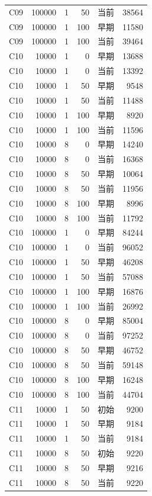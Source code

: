 \documentclass[UTF8,a4paper,10pt,twocolumn,fontset=fandol]{ctexart}
\begin{document}
\begin{longtable}{@{}lrrrlr@{}}
C09 & 100000 & 1 & 50 & 当前 & 38564 \\
C09 & 100000 & 1 & 100 & 早期 & 11580 \\
C09 & 100000 & 1 & 100 & 当前 & 39464 \\
C10 & 10000 & 1 & 0 & 早期 & 13688 \\
C10 & 10000 & 1 & 0 & 当前 & 13392 \\
C10 & 10000 & 1 & 50 & 早期 & 9548 \\
C10 & 10000 & 1 & 50 & 当前 & 11488 \\
C10 & 10000 & 1 & 100 & 早期 & 8920 \\
C10 & 10000 & 1 & 100 & 当前 & 11596 \\
C10 & 10000 & 8 & 0 & 早期 & 14240 \\
C10 & 10000 & 8 & 0 & 当前 & 16368 \\
C10 & 10000 & 8 & 50 & 早期 & 10064 \\
C10 & 10000 & 8 & 50 & 当前 & 11956 \\
C10 & 10000 & 8 & 100 & 早期 & 8996 \\
C10 & 10000 & 8 & 100 & 当前 & 11792 \\
C10 & 100000 & 1 & 0 & 早期 & 84244 \\
C10 & 100000 & 1 & 0 & 当前 & 96052 \\
C10 & 100000 & 1 & 50 & 早期 & 46208 \\
C10 & 100000 & 1 & 50 & 当前 & 57088 \\
C10 & 100000 & 1 & 100 & 早期 & 16876 \\
C10 & 100000 & 1 & 100 & 当前 & 26992 \\
C10 & 100000 & 8 & 0 & 早期 & 85004 \\
C10 & 100000 & 8 & 0 & 当前 & 97252 \\
C10 & 100000 & 8 & 50 & 早期 & 46752 \\
C10 & 100000 & 8 & 50 & 当前 & 59148 \\
C10 & 100000 & 8 & 100 & 早期 & 16248 \\
C10 & 100000 & 8 & 100 & 当前 & 44704 \\
C11 & 10000 & 1 & 50 & 初始 & 9200 \\
C11 & 10000 & 1 & 50 & 早期 & 9184 \\
C11 & 10000 & 1 & 50 & 当前 & 9184 \\
C11 & 10000 & 8 & 50 & 初始 & 9220 \\
C11 & 10000 & 8 & 50 & 早期 & 9216 \\
C11 & 10000 & 8 & 50 & 当前 & 9220 \\

\end{longtable}
\end{document}

